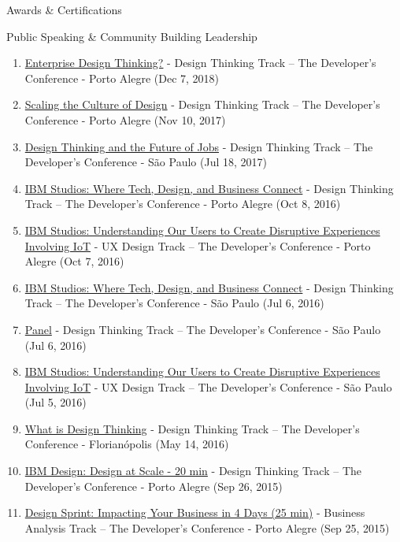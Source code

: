 \documentclass{resume} %
\begin{document}
\begin{rSection}{Awards \& Certifications}
\begin{rSection}{Public Speaking \& Community Building Leadership}
\begin{enumerate}
    \item  \href{https://thedevconf.com/tdc/2018/portoalegre/trilha-design-thinking}{Enterprise Design Thinking?} - Design Thinking Track -- The Developer's Conference - Porto Alegre (Dec 7, 2018)
    \item  \href{https://thedevconf.com/tdc/2017/portoalegre/trilha-design-thinking}{Scaling the Culture of Design} - Design Thinking Track -- The Developer's Conference - Porto Alegre (Nov 10, 2017)
    \item  \href{https://thedevconf.com/tdc/2017/saopaulo/trilha-design-thinking}{Design Thinking and the Future of Jobs} - Design Thinking Track -- The Developer's Conference - São Paulo (Jul 18, 2017)
    \item  \href{https://thedevconf.com/tdc/2016/portoalegre/trilha-design-thinking}{IBM Studios: Where Tech, Design, and Business Connect} - Design Thinking Track -- The Developer's Conference - Porto Alegre (Oct 8, 2016)
    \item  \href{https://thedevconf.com/tdc/2016/portoalegre/trilha-ux-design}{IBM Studios: Understanding Our Users to Create Disruptive Experiences Involving IoT} - UX Design Track -- The Developer's Conference - Porto Alegre (Oct 7, 2016)
    \item  \href{https://thedevconf.com/tdc/2016/saopaulo/trilha-design-thinking}{IBM Studios: Where Tech, Design, and Business Connect} - Design Thinking Track -- The Developer's Conference - São Paulo (Jul 6, 2016)
    \item  \href{https://thedevconf.com/tdc/2016/saopaulo/trilha-design-thinking}{Panel} - Design Thinking Track -- The Developer's Conference - São Paulo (Jul 6, 2016)
    \item  \href{https://thedevconf.com/tdc/2016/saopaulo/trilha-ux-design}{IBM Studios: Understanding Our Users to Create Disruptive Experiences Involving IoT} - UX Design Track -- The Developer's Conference - São Paulo (Jul 5, 2016)
    \item  \href{https://thedevconf.com/tdc/2016/florianopolis/trilha-design-thinking}{What is Design Thinking} - Design Thinking Track -- The Developer's Conference - Florianópolis (May 14, 2016)
    \item  \href{https://thedevconf.com/tdc/2015/portoalegre/trilha-design-thinking}{IBM Design: Design at Scale - 20 min} - Design Thinking Track -- The Developer's Conference - Porto Alegre (Sep 26, 2015)
    \item  \href{https://thedevconf.com/tdc/2015/portoalegre/trilha-analise-de-negocios}{Design Sprint: Impacting Your Business in 4 Days (25 min)} - Business Analysis Track -- The Developer's Conference - Porto Alegre (Sep 25, 2015)

\end{enumerate}
\end{rSection}
\end{rSection}
\end{document}
